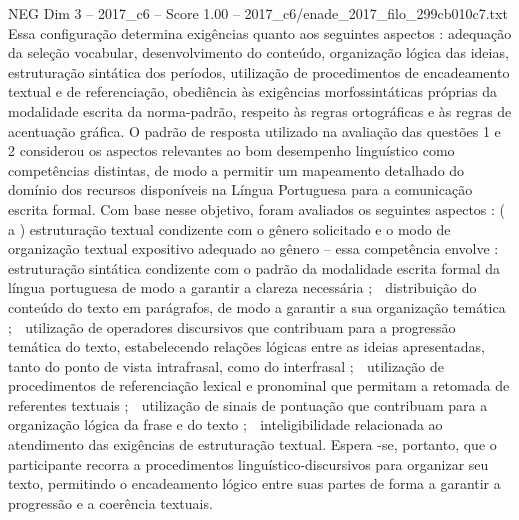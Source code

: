 \begin{textsample}{NEG Dim 3 – 2017\_c6 – Score 1.00 – 2017\_c6/enade\_2017\_filo\_299cb010c7.txt}
Essa configuração determina exigências quanto aos seguintes aspectos : adequação da seleção vocabular, desenvolvimento do conteúdo, organização lógica das ideias, estruturação sintática dos períodos, utilização de procedimentos de encadeamento textual e de referenciação, obediência às exigências morfossintáticas próprias da modalidade escrita da norma-padrão, respeito às regras ortográficas e às regras de acentuação gráfica.
O padrão de resposta utilizado na avaliação das questões 1 e 2 considerou os aspectos relevantes ao bom desempenho linguístico como competências distintas, de modo a permitir um mapeamento detalhado do domínio dos recursos disponíveis na Língua Portuguesa para a comunicação escrita formal.
Com base nesse objetivo, foram avaliados os seguintes aspectos : ( a ) estruturação textual condizente com o gênero solicitado e o modo de organização textual expositivo adequado ao gênero – essa competência envolve :  estruturação sintática condizente com o padrão da modalidade escrita formal da língua portuguesa de modo a garantir a clareza necessária ;  distribuição do conteúdo do texto em parágrafos, de modo a garantir a sua organização temática ;  utilização de operadores discursivos que contribuam para a progressão temática do texto, estabelecendo relações lógicas entre as ideias apresentadas, tanto do ponto de vista intrafrasal, como do interfrasal ;  utilização de procedimentos de referenciação lexical e pronominal que permitam a retomada de referentes textuais ;  utilização de sinais de pontuação que contribuam para a organização lógica da frase e do texto ;  inteligibilidade relacionada ao atendimento das exigências de estruturação textual.
Espera -se, portanto, que o participante recorra a procedimentos linguístico-discursivos para organizar seu texto, permitindo o encadeamento lógico entre suas partes de forma a garantir a progressão e a coerência textuais.

\end{textsample}
